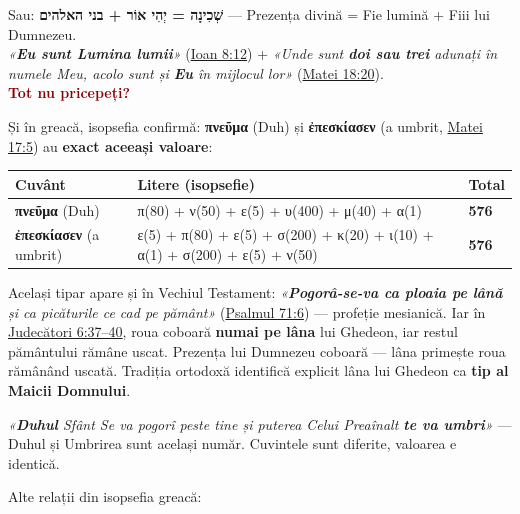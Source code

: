 \documentclass[12pt,a4paper,twoside,openany]{book}
\begin{document}
Sau: \textbf{שְׁכִינָה = יְהִי אוֹר + בני האלהים} — Prezența divină = Fie lumină + Fiii lui Dumnezeu. \\

\textit{«\textbf{Eu sunt Lumina lumii}»} (\href{https://bibliaortodoxa.ro/carte.php?id=35\&cap=8\#12}{Ioan 8:12}) + \textit{«Unde sunt \textbf{doi sau trei} adunați în numele Meu, acolo sunt și \textbf{Eu} în mijlocul lor»} (\href{https://bibliaortodoxa.ro/carte.php?id=55\&cap=18\#20}{Matei 18:20}). \\

\textcolor{darkred}{\textbf{Tot nu pricepeți?}}

Și în greacă, isopsefia confirmă: \textbf{πνεῦμα} (Duh) și \textbf{ἐπεσκίασεν} (a umbrit, \href{https://bibliaortodoxa.ro/carte.php?id=55\&cap=17\#5}{Matei 17:5}) au \textbf{exact aceeași valoare}:

\begin{center}
\small
\begin{tabular}{L{3.0cm}L{11.1cm}L{0.8cm}}
\toprule
{}
\textbf{Cuvânt} & \textbf{Litere (isopsefie)} & \textbf{Total} \\
\midrule
\textbf{πνεῦμα} (Duh) & π(80) + ν(50) + ε(5) + υ(400) + μ(40) + α(1) & \textbf{576} \\
\textbf{ἐπεσκίασεν} (a umbrit) & ε(5) + π(80) + ε(5) + σ(200) + κ(20) + ι(10) + α(1) + σ(200) + ε(5) + ν(50) & \textbf{576} \\
\bottomrule
\end{tabular}
\end{center}
\normalsize
Același tipar apare și în Vechiul Testament: \textit{«\textbf{Pogorâ-se-va ca ploaia pe lână} și ca picăturile ce cad pe pământ»} (\href{https://bibliaortodoxa.ro/carte.php?id=65\&cap=71\#6}{Psalmul 71:6}) — profeție mesianică. Iar în \href{https://bibliaortodoxa.ro/carte.php?id=46\&cap=6\#37}{Judecători 6:37–40}, roua coboară \textbf{numai pe lâna} lui Ghedeon, iar restul pământului rămâne uscat. Prezența lui Dumnezeu coboară — lâna primește roua rămânând uscată. Tradiția ortodoxă identifică explicit lâna lui Ghedeon ca \textbf{tip al Maicii Domnului}.

\textit{«\textbf{Duhul} Sfânt Se va pogorî peste tine și puterea Celui Preaînalt \textbf{te va umbri}»} — Duhul și Umbrirea sunt același număr. Cuvintele sunt diferite, valoarea e identică.

Alte relații din isopsefia greacă:
\end{document}
